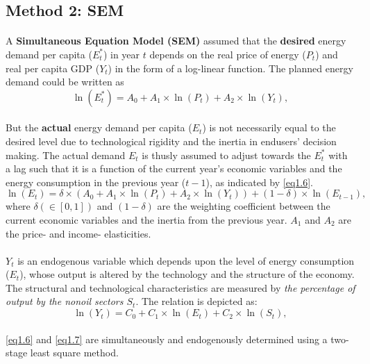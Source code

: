 \subsection{Method 2: SEM}
	\paragraph{}{A \textbf{Simultaneous Equation Model (SEM)} assumed that the \textbf{desired} energy demand per capita ($E_t^*$) in year $t$ depends on the real price  of energy ($P_t$) and real per capita GDP ($Y_t$) in the form of a log-linear function. The planned energy demand could be written as
		\begin{equation}\label{eq1.5}
			\ln(E_t^*)=A_0 + A_1 \times \ln(P_t) + A_2 \times \ln(Y_t),
		\end{equation}}
	
	\paragraph{}{But the \textbf{actual} energy demand per capita ($E_t$) is not necessarily equal to the desired level due to technological rigidity and the inertia in endusers' decision making. The actual demand $E_t$ is thusly assumed to adjust towards the $E_t^*$ with a lag such that it is a function of the current year's economic variables and the energy consumption in the previous year ($t-1$), as indicated by \cref{eq1.6}.
		\begin{equation}\label{eq1.6}
			\ln(E_t)= \delta \times (A_0 + A_1 \times \ln(P_t) + A_2 \times \ln(Y_t)) + (1-\delta) \times \ln(E_{t-1}),
		\end{equation}
	where $\delta(\in [0,1])$ and $(1-\delta)$ are the weighting coefficient between the current economic variables and the inertia from the previous year.  $A_1$ and $A_2$ are the price- and income- elasticities. 
	}

	\paragraph{}{$Y_t$ is an endogenous variable which depends upon the level of energy consumption ($E_t$), whose output is altered by the technology and the structure of the economy. The structural and technological characteristics are measured by \textit{the percentage of output by the nonoil sectors $S_t$}. The relation is depicted as:
		\begin{equation}\label{eq1.7}
			\ln(Y_t) = C_0 + C_1 \times \ln(E_t) + C_2 \times \ln(S_t),
		\end{equation} \\
	\cref{eq1.6} and \cref{eq1.7} are simultaneously and endogenously determined using a two-stage least square method. 
	}

